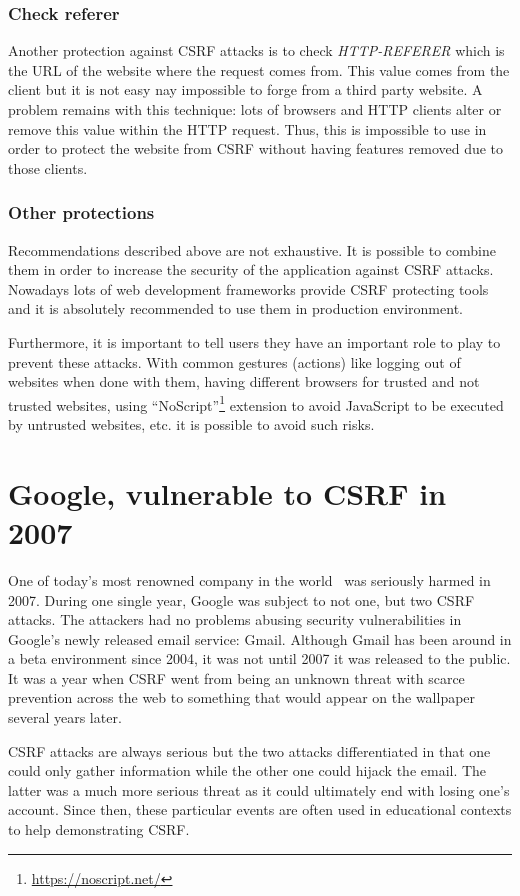 \documentclass[a4paper,11pt,openany]{report}
\begin{document}
  \subsubsection{Check referer}
  Another protection against CSRF attacks is to check \textit{HTTP-REFERER} which is the URL of the 
  website where the request comes from. This value comes from the client but it is not easy nay impossible 
  to forge from a third party website. A problem remains with this technique: lots of browsers and HTTP 
  clients alter or remove this value within the HTTP request. Thus, this is impossible to use in order 
  to protect the website from CSRF without having features removed due to those clients.
   
  \subsubsection{Other protections}  
  Recommendations described above are not exhaustive. It is possible to combine them in order to increase 
  the security of the application against CSRF attacks. Nowadays lots of web development frameworks provide 
  CSRF protecting tools and it is absolutely recommended to use them in production environment.
  
  Furthermore, it is important to tell users they have an important role to play to prevent these attacks. 
  With common gestures (actions) like logging out of websites when done with them, having different browsers 
  for trusted and not trusted websites, using ``NoScript''\footnote{\url{https://noscript.net/}} extension to 
  avoid JavaScript to be executed by untrusted websites, etc. it is possible to avoid such risks.
  
  \section{Google, vulnerable to CSRF in 2007}
  One of today's most renowned company in the world~\cite{forbes} was seriously harmed in 2007. During one single year, 
  Google was subject to not one, but two CSRF attacks. The attackers had no problems abusing security 
  vulnerabilities in Google's newly released email service: Gmail. Although Gmail has been around in a beta 
  environment since 2004, it was not until 2007 it was released to the public. It was a year when CSRF went from 
  being an unknown threat with scarce prevention across the web to something that would appear on the wallpaper 
  several years later.
  
  CSRF attacks are always serious but the two attacks differentiated in that one could only gather information 
  while the other one could hijack the email. The latter was a much more serious threat as it could ultimately end 
  with losing one's account. Since then, these particular events are often used in educational contexts to help 
  demonstrating CSRF. 
\end{document}

